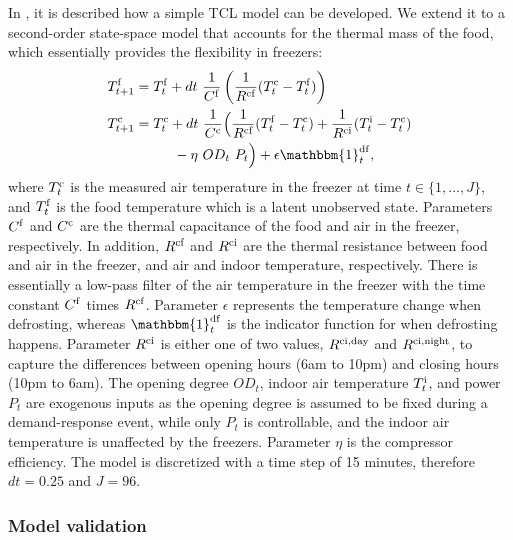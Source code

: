 \documentclass[11pt,a4paper]{article}
\begin{document}
In \cite{hao2014aggregate}, it is described how a simple TCL model can be developed. We extend it to a second-order state-space model that accounts for the thermal mass of the food, which essentially provides the flexibility in freezers:
%
\begin{subequations}\label{eq:2ndFreezerStateSpace}
    \begin{align}
        T^{\rm{f}}_{t+1} & = T^{\rm{f}}_{t} + dt\  \frac{1}{C^{\rm{f}}}\left(\frac{1}{R^{\rm{cf}}} (T^{\rm{c}}_{t} - T^{\rm{f}}_{t}) \right)                                                                                         \\
        T^{\rm{c}}_{t+1} & = T^{\rm{c}}_t + dt\  \frac{1}{C^{\rm{c}}}\Bigl(\frac{1}{R^{\rm{cf}}} (T^{\rm{f}}_t - T^{\rm{c}}_t) + \frac{1}{R^{\rm{ci}}} (T^{\rm{i}}_t - T^{\rm{c}}_t)                                          \notag \\ & \mspace{50mu} - \eta\  OD_t \ P_t \Bigr) + \epsilon \mathbbm{1}^{\rm{df}}_{t},
    \end{align}
\end{subequations}
%
where $T^{\rm{c}}_t$ is the measured air temperature in the freezer at time $t \in \{1, \ldots, J\}$, and $T^{\rm{f}}_t$ is the food temperature which is a latent unobserved state.
Parameters $C^{\rm{f}}$ and $C^{\rm{c}}$ are the thermal capacitance of the food and air in the freezer, respectively. In addition, $R^{\rm{cf}}$ and $R^{\rm{ci}}$ are the thermal resistance between food and air in the freezer, and air and indoor temperature, respectively.
There is essentially a low-pass filter of the air temperature in the freezer with the time constant $C^{\rm{f}}$ times $R^{\rm{cf}}$. Parameter $\epsilon$ represents the temperature change when defrosting, whereas $\mathbbm{1}^{\rm{df}}_{t}$ is the indicator function for when defrosting happens. Parameter $R^{\rm{ci}}$ is either one of two values, $R^{\rm{ci}, \text{day}}$ and $R^{\rm{ci}, \text{night}}$, to capture the differences between opening hours (6am to 10pm) and closing hours (10pm to 6am). The opening degree $OD_t$, indoor air temperature $T^{\rm{i}}_t$, and power $P_t$ are exogenous inputs as the opening degree is assumed to be fixed during a demand-response event, while only $P_t$ is controllable, and the indoor air temperature is unaffected by the freezers. Parameter $\eta$ is the compressor efficiency. The model is discretized with a time step of 15 minutes, therefore $dt = 0.25$ and $J = 96$.

\subsubsection{Model validation}
\end{document}
